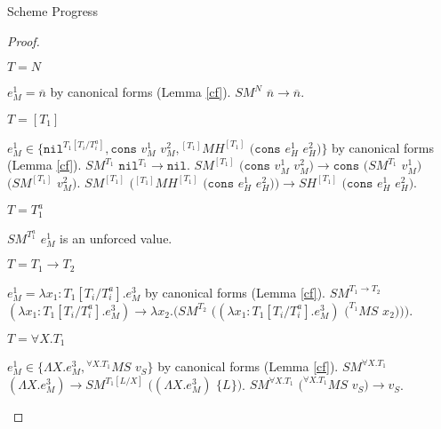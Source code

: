 \begin{theorem}{Scheme Progress}
\begin{proof}
\begin{case}
\begin{subcase}

$T=N$

$e_{M}^{1}=\overline{n}$ by canonical forms (Lemma \ref{cf}).  $SM^{N}$ $\overline{n}\rightarrow\overline{n}$.

\end{subcase}

\begin{subcase}

$T=[T_{1}]$

$e_{M}^{1}\in\lbrace\mathtt{nil}^{T_{1}[T_{i}/T_{i}^{a}]},\mathtt{cons}$ $v_{M}^{1}$ $v_{M}^{2},{^{[T_{1}]}M}H^{[T_{1}]}$ $(\mathtt{cons}$ $e_{H}^{1}$ $e_{H}^{2})\rbrace$ by canonical forms (Lemma \ref{cf}).  $SM^{T_{1}}$ $\mathtt{nil}^{T_{1}}\rightarrow\mathtt{nil}$.  $SM^{[T_{1}]}$ $(\mathtt{cons}$ $v_{M}^{1}$ $v_{M}^{2})\rightarrow\mathtt{cons}$ $(SM^{T_{1}}$ $v_{M}^{1})$ $(SM^{[T_{1}]}$ $v_{M}^{2})$.  $SM^{[T_{1}]}$ $({^{[T_{1}]}M}H^{[T_{1}]}$ $(\mathtt{cons}$ $e_{H}^{1}$ $e_{H}^{2}))\rightarrow SH^{[T_{1}]}$ $(\mathtt{cons}$ $e_{H}^{1}$ $e_{H}^{2})$.

\end{subcase}

\begin{subcase}

$T=T_{1}^{a}$

$SM^{T_{1}^{a}}$ $e_{M}^{1}$ is an unforced value.

\end{subcase}

\begin{subcase}

$T=T_{1}\rightarrow T_{2}$

$e_{M}^{1}=\lambda x_{1}:T_{1}[T_{i}/T_{i}^{a}].e_{M}^{3}$ by canonical forms (Lemma \ref{cf}).  $SM^{T_{1}\rightarrow T_{2}}$ $(\lambda x_{1}:T_{1}[T_{i}/T_{i}^{a}].e_{M}^{3})\rightarrow\lambda x_{2}.(SM^{T_{2}}$ $((\lambda x_{1}:T_{1}[T_{i}/T_{i}^{a}].e_{M}^{3})$ $(^{T_{1}}MS$ $x_{2})))$.

\end{subcase}

\begin{subcase}

$T=\forall X.T_{1}$

$e_{M}^{1}\in\lbrace\Lambda X.e_{M}^{3},{^{\forall X.T_{1}}M}S$ $v_{S}\rbrace$ by canonical forms (Lemma \ref{cf}).  $SM^{\forall X.T_{1}}$ $(\Lambda X.e_{M}^{3})\rightarrow SM^{T_{1}[L/X]}$ $((\Lambda X.e_{M}^{3})$ $\lbrace L\rbrace)$.  $SM^{\forall X.T_{1}}$ $(^{\forall X.T_{1}}MS$ $v_{S})\rightarrow v_{S}$.

\end{subcase}

\end{case}

\end{proof}

\end{theorem}
